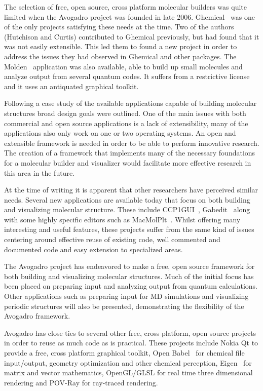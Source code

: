 \documentclass[10pt]{bmc_article}
\newenvironment{bmcformat}{\begin{raggedright}
\baselineskip20pt\sloppy\setboolean{publ}{false}}{\end{raggedright}
\baselineskip20pt\sloppy}
\begin{document}
\begin{bmcformat}
The selection of free, open source, cross platform molecular builders was quite
limited when the Avogadro project was founded in late 2006.
Ghemical~\cite{Ghemical} was one of the only projects satisfying these needs at
the time. Two of the authors (Hutchison and Curtis) contributed to Ghemical
previously, but had found that it was not easily extensible. This led them to
found a new project in order to address the issues they had observed in Ghemical
and other packages. The Molden~\cite{Molden} application was also available,
able to build up small molecules and analyze output from several quantum codes.
It suffers from a restrictive license and it uses an antiquated graphical
toolkit.

Following a case study of the available applications capable of building
molecular structures broad design goals were outlined. One of the main issues
with both commercial and open source applications is a lack of extensibility,
many of the applications also only work on one or two operating systems. An open
and extensible framework is needed in order to be able to perform innovative
research. The creation of a framework that implements many of the necessary
foundations for a molecular builder and visualizer would facilitate more
effective research in this area in the future.

At the time of writing it is apparent that other researchers have perceived
similar needs. Several new applications are available today that focus on both
building and visualizing molecular structure. These include
CCP1GUI~\cite{CCP1GUI}, Gabedit~\cite{Gabedit} along with some highly specific
editors such as MacMolPlt~\cite{MacMolPlt}. Whilst offering many interesting and
useful features, these projects suffer from the same kind of issues centering
around effective reuse of existing code, well commented and documented code and
easy extension to specialized areas.

The Avogadro project has endeavored to make a free, open source framework for
both building and visualizing molecular structures. Much of the initial focus
has been placed on preparing input and analyzing output from quantum
calculations. Other applications such as preparing input for MD simulations and
visualizing periodic structures will also be presented, demonstrating the
flexibility of the Avogadro framework.

Avogadro has close ties to several other free, cross platform, open source
projects in order to reuse as much code as is practical. These projects include
Nokia Qt to provide a free, cross platform graphical toolkit, Open
Babel~\cite{OpenBabel} for chemical file input/output, geometry optimization and
other chemical perception, Eigen~\cite{Eigen} for matrix and vector mathematics,
OpenGL/GLSL for real time three dimensional rendering and POV-Ray for ray-traced
rendering.


\end{bmcformat}
\end{document}

